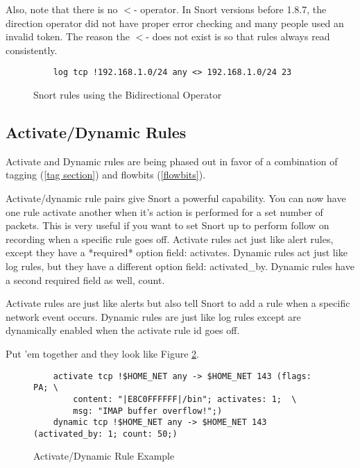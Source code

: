 \documentclass[english]{report}
\newenvironment{note}{
\samepage
    \vspace{10pt}{\textsf{
        {\hspace{7pt}\Huge{$\triangle$\hspace{-12.5pt}{\Large{$^!$}}}}\hspace{5pt}
        {\Large{NOTE}}
    }
    }
   \begin{center}
    \par\vspace{-17pt}

    \begin{lrbox}{\savepar}
    \begin{minipage}[r]{6in}
}
{
    \end{minipage}
    \end{lrbox}
    \fbox{
        \usebox{
            \savepar
	}
    }
    \par\vskip10pt
    \end{center}
}
\newenvironment{note}{
        \begin{rawhtml}
        <p><table border="1"><tr><td><b>
        Note:&nbsp;&nbsp;</b>
        \end{rawhtml}
}{
        \begin{rawhtml}
        </b></td></tr></table></p>
        \end{rawhtml}
}
\begin{document}
Also, note that there is no $<$- operator. In Snort versions before 1.8.7, the
direction operator did not have proper error checking and many people used an
invalid token. The reason the $<$- does not exist is so that rules always read
consistently.

\begin{figure}
\begin{verbatim}
    log tcp !192.168.1.0/24 any <> 192.168.1.0/24 23
\end{verbatim}

\caption{\label{bidirectional operator}Snort rules using the Bidirectional
Operator}
\end{figure}

\subsection{Activate/Dynamic Rules}
\label{dynamic rules}

\begin{note}

Activate and Dynamic rules are being phased out in favor of a combination of
tagging (\ref{tag section}) and flowbits (\ref{flowbits}). 

\end{note}

Activate/dynamic rule pairs give Snort a powerful capability. You can now have
one rule activate another when it's action is performed for a set number of
packets. This is very useful if you want to set Snort up to perform follow on
recording when a specific rule goes off. Activate rules act just like alert
rules, except they have a {*}required{*} option field: activates.  Dynamic
rules act just like log rules, but they have a different option field:
activated\_by. Dynamic rules have a second required field as well, count. 

Activate rules are just like alerts but also tell Snort to add a rule when a
specific network event occurs. Dynamic rules are just like log rules except are
dynamically enabled when the activate rule id goes off. 

Put 'em together and they look like Figure \ref{activate/dynamic rule example}.

\begin{figure}
\begin{verbatim}
    activate tcp !$HOME_NET any -> $HOME_NET 143 (flags: PA; \
        content: "|E8C0FFFFFF|/bin"; activates: 1;  \
        msg: "IMAP buffer overflow!";)
    dynamic tcp !$HOME_NET any -> $HOME_NET 143 (activated_by: 1; count: 50;)
\end{verbatim}

\caption{Activate/Dynamic Rule Example}
\label{activate/dynamic rule example}
\end{figure}
\end{document}
